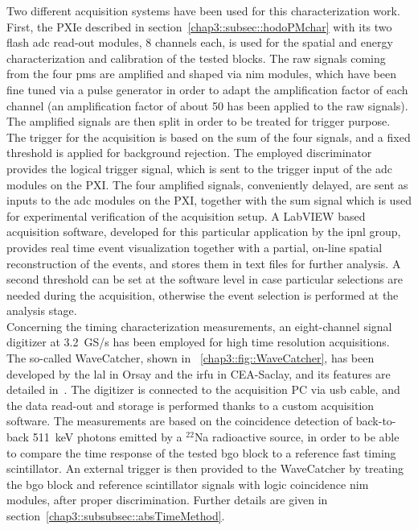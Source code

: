 Two different acquisition systems have been used for this characterization work. First, the PXIe described in section~\ref{chap3::subsec::hodoPMchar} with its two flash \gls{adc} read-out modules, 8 channels each, is used for the spatial and energy characterization and calibration of the tested blocks. The raw signals coming from the four \glspl{pm} are amplified and shaped via \gls{nim} modules, which have been fine tuned via a pulse generator in order to adapt the amplification factor of each channel (an amplification factor of about 50 has been applied to the raw signals). The amplified signals are then split in order to be treated for trigger purpose. The trigger for the acquisition is based on the sum of the four signals, and a fixed threshold is applied for background rejection. The employed discriminator provides the logical trigger signal, which is sent to the trigger input of the \gls{adc} modules on the PXI. The four amplified signals, conveniently delayed, are sent as inputs to the \gls{adc} modules on the PXI, together with the sum signal which is used for experimental verification of the acquisition setup. A LabVIEW based acquisition software, developed for this particular application by the \gls{ipnl} group, provides real time event visualization together with a partial, on-line spatial reconstruction of the events, and stores them in text files for further analysis. A second threshold can be set at the software level in case particular selections are needed during the acquisition, otherwise the event selection is performed at the analysis stage.\\
Concerning the timing characterization measurements, an eight-channel signal digitizer at 3.2~GS/s has been employed for high time resolution acquisitions. The so-called WaveCatcher, shown in \figurename~\ref{chap3::fig::WaveCatcher}, has been developed by the \gls{lal} in Orsay and the \gls{irfu} in CEA-Saclay, and its features are detailed in~\cite{Breton2014}. The digitizer is connected to the acquisition PC via \gls{usb} cable, and the data read-out and storage is performed thanks to a custom acquisition software.  The measurements are based on the coincidence detection of back-to-back 511~keV photons emitted by a $^{22}$Na radioactive source, in order to be able to compare the time response of the tested \gls{bgo} block to a reference fast timing scintillator. An external trigger is then provided to the WaveCatcher by treating the \gls{bgo} block and reference scintillator signals with logic coincidence \gls{nim} modules, after proper discrimination. Further details are given in section~\ref{chap3::subsubsec::absTimeMethod}.


